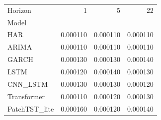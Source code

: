 \begin{tabular}{lrrr}
\toprule
Horizon & 1 & 5 & 22 \\
Model &  &  &  \\
\midrule
HAR & 0.000110 & 0.000110 & 0.000110 \\
ARIMA & 0.000110 & 0.000110 & 0.000110 \\
GARCH & 0.000130 & 0.000130 & 0.000140 \\
LSTM & 0.000120 & 0.000140 & 0.000130 \\
CNN_LSTM & 0.000130 & 0.000130 & 0.000120 \\
Transformer & 0.000110 & 0.000120 & 0.000130 \\
PatchTST_lite & 0.000160 & 0.000120 & 0.000140 \\
\bottomrule
\end{tabular}
